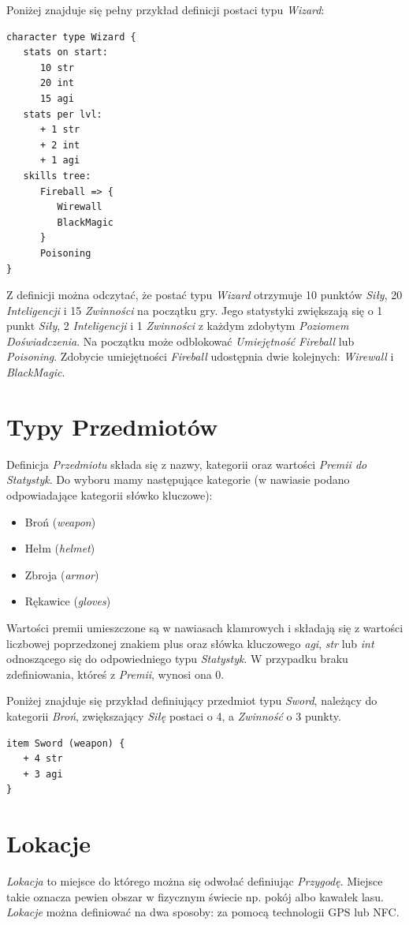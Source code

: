 \documentclass[openright]{xmgr}
\begin{document}
Poniżej znajduje się pełny przykład definicji postaci typu \textit{Wizard}:
\begin{verbatim}
character type Wizard {
   stats on start:
      10 str
      20 int
      15 agi
   stats per lvl:
      + 1 str
      + 2 int
      + 1 agi
   skills tree:
      Fireball => {
         Wirewall
         BlackMagic
      }
      Poisoning
}
\end{verbatim}
Z definicji można odczytać, że postać typu \textit{Wizard} otrzymuje 10 punktów \textit{Siły}, 20 \textit{Inteligencji} i 15 \textit{Zwinności} na początku gry.
Jego statystyki zwiększają się o 1 punkt \textit{Siły}, 2 \textit{Inteligencji} i 1 \textit{Zwinności} z każdym zdobytym \textit{Poziomem Doświadczenia}.
Na początku może odblokować \textit{Umiejętność} \textit{Fireball} lub \textit{Poisoning}. Zdobycie umiejętności \textit{Fireball} udostępnia dwie kolejnych: \textit{Wirewall} i \textit{BlackMagic}. 

\section{Typy Przedmiotów}
Definicja \textit{Przedmiotu} składa się z nazwy, kategorii oraz wartości \textit{Premii do Statystyk}. Do wyboru mamy następujące kategorie (w nawiasie podano odpowiadające kategorii słówko kluczowe):
\begin{itemize}
	\item Broń (\textit{weapon})
	\item Hełm (\textit{helmet})
	\item Zbroja (\textit{armor})
	\item Rękawice (\textit{gloves})
\end{itemize}
Wartości premii umieszczone są w nawiasach klamrowych i składają się z wartości liczbowej poprzedzonej znakiem plus oraz słówka kluczowego \textit{agi}, \textit{str} lub \textit{int} odnoszącego się do odpowiedniego typu \textit{Statystyk}. W przypadku braku zdefiniowania, któreś z \textit{Premii}, wynosi ona 0.

Poniżej znajduje się przykład definiujący przedmiot typu \textit{Sword}, należący do kategorii \textit{Broń}, zwiększający \textit{Siłę} postaci o 4, a \textit{Zwinność} o 3 punkty.
\begin{verbatim}
item Sword (weapon) {
   + 4 str
   + 3 agi
}
\end{verbatim}

\section{Lokacje}
\textit{Lokacja} to miejsce do którego można się odwołać definiując \textit{Przygodę}. Miejsce takie oznacza pewien obszar w fizycznym świecie np. pokój albo kawałek lasu. \textit{Lokacje} można definiować na dwa sposoby: za pomocą technologii GPS lub NFC. 
\end{document}

